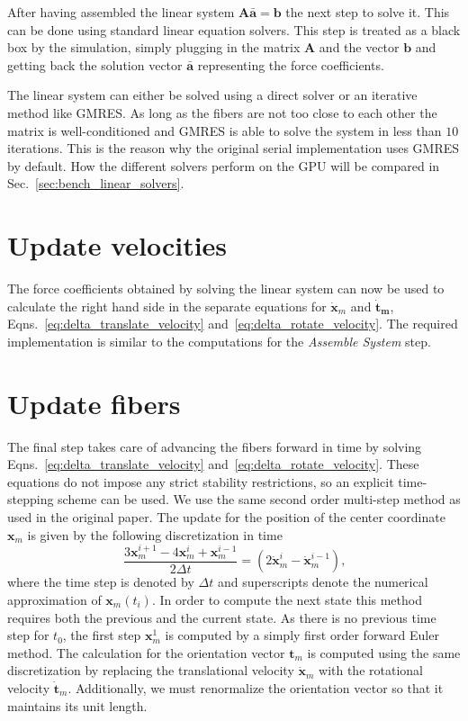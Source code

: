 After having assembled the linear system $\mathbf{A}\mathbf{\bar{a}}=\mathbf{b}$ the next step to solve it. This can be done using standard linear equation solvers. This step is treated as a black box by the simulation, simply plugging in the matrix $\mathbf{A}$ and the vector $\mathbf{b}$ and getting back the solution vector $\mathbf{\bar{a}}$ representing the force coefficients.

The linear system can either be solved using a direct solver or an iterative method like GMRES. As long as the fibers are not too close to each other the matrix is well-conditioned and GMRES is able to solve the system in less than $10$ iterations. This is the reason why the original serial implementation uses GMRES by default. How the different solvers perform on the GPU will be compared in Sec.~\ref{sec:bench_linear_solvers}.

\section{Update velocities}

The force coefficients obtained by solving the linear system can now be used to calculate the right hand side in the separate equations for $\mathbf{\dot{x}}_m$ and $\mathbf{\dot{t}_m}$, Eqns.~\eqref{eq:delta_translate_velocity} and~\eqref{eq:delta_rotate_velocity}. The required implementation is similar to the computations for the \emph{Assemble System} step.

\section{Update fibers}
\label{sec:serial_update_fibers}

The final step takes care of advancing the fibers forward in time by solving Eqns.~\eqref{eq:delta_translate_velocity} and~\eqref{eq:delta_rotate_velocity}. These equations do not impose any strict stability restrictions, so an explicit time-stepping scheme can be used. We use the same second order multi-step method as used in the original paper. The update for the position of the center coordinate $\mathbf{x}_m$ is given by the following discretization in time
\begin{equation}
  \label{eq:time_discretization}
  \frac{3\mathbf{x}_m^{i+1} - 4\mathbf{x}_m^{i} + \mathbf{x}_m^{i-1}}{2 \Delta t} = (2\mathbf{\dot{x}}_m^{i} - \mathbf{\dot{x}}_m^{i-1}) \text{,}
\end{equation}
where the time step is denoted by $\Delta t$ and superscripts denote the numerical approximation of $\mathbf{x}_m(t_i)$. In order to compute the next state this method requires both the previous and the current state. As there is no previous time step for $t_0$, the first step $\mathbf{x}_{m}^{1}$ is computed by a simply first order forward Euler method. The calculation for the orientation vector $\mathbf{t}_m$ is computed using the same discretization by replacing the translational velocity $\mathbf{\dot{x}}_m$ with the rotational velocity $\mathbf{\dot{t}}_m$. Additionally, we must renormalize the orientation vector so that it maintains its unit length.

